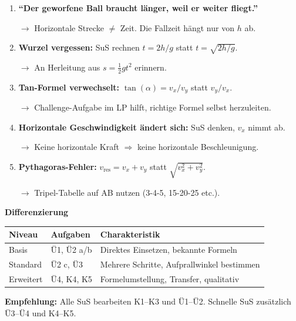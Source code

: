 \documentclass[10pt, a4paper]{article}
\newcommand{\fachfarbe}{physik}
\newcommand{\abschnitt}[1]{%
    \vspace{8pt}
    \noindent\textbf{\textcolor{\fachfarbe}{#1}}
    \vspace{4pt}
}
\begin{document}
\begin{hinweisbox}
\begin{enumerate}
    \item \textbf{``Der geworfene Ball braucht länger, weil er weiter fliegt.''}

    $\to$ Horizontale Strecke $\neq$ Zeit. Die Fallzeit hängt nur von $h$ ab.

    \item \textbf{Wurzel vergessen:} SuS rechnen $t = 2h/g$ statt $t = \sqrt{2h/g}$.

    $\to$ An Herleitung aus $s = \frac{1}{2}gt^2$ erinnern.

    \item \textbf{Tan-Formel verwechselt:} $\tan(\alpha) = v_x/v_y$ statt $v_y/v_x$.

    $\to$ Challenge-Aufgabe im LP hilft, richtige Formel selbst herzuleiten.

    \item \textbf{Horizontale Geschwindigkeit ändert sich:} SuS denken, $v_x$ nimmt ab.

    $\to$ Keine horizontale Kraft $\Rightarrow$ keine horizontale Beschleunigung.

    \item \textbf{Pythagoras-Fehler:} $v_{\text{res}} = v_x + v_y$ statt $\sqrt{v_x^2 + v_y^2}$.

    $\to$ Tripel-Tabelle auf AB nutzen (3-4-5, 15-20-25 etc.).
\end{enumerate}
\end{hinweisbox}


\abschnitt{Differenzierung}

\begin{tabular}{|l|l|p{6.5cm}|}
\hline
\textbf{Niveau} & \textbf{Aufgaben} & \textbf{Charakteristik} \\
\hline
Basis & Ü1, Ü2 a/b & Direktes Einsetzen, bekannte Formeln \\
\hline
Standard & Ü2 c, Ü3 & Mehrere Schritte, Aufprallwinkel bestimmen \\
\hline
Erweitert & Ü4, K4, K5 & Formelumstellung, Transfer, qualitativ \\
\hline
\end{tabular}

\vspace{4pt}
\textbf{Empfehlung:} Alle SuS bearbeiten K1--K3 und Ü1--Ü2. Schnelle SuS zusätzlich Ü3--Ü4 und K4--K5.
\end{document}
